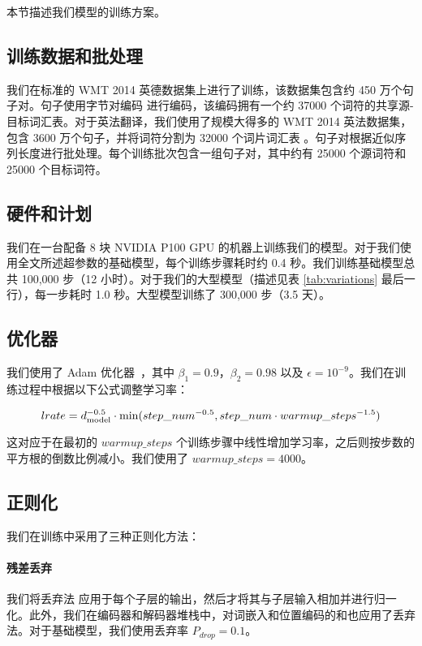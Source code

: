 本节描述我们模型的训练方案。


\subsection{训练数据和批处理}
我们在标准的 WMT 2014 英德数据集上进行了训练，该数据集包含约 450 万个句子对。句子使用字节对编码 \citep{DBLP:journals/corr/BritzGLL17} 进行编码，该编码拥有一个约 37000 个词符的共享源-目标词汇表。对于英法翻译，我们使用了规模大得多的 WMT 2014 英法数据集，包含 3600 万个句子，并将词符分割为 32000 个词片词汇表 \citep{wu2016google}。句子对根据近似序列长度进行批处理。每个训练批次包含一组句子对，其中约有 25000 个源词符和 25000 个目标词符。

\subsection{硬件和计划}

我们在一台配备 8 块 NVIDIA P100 GPU 的机器上训练我们的模型。对于我们使用全文所述超参数的基础模型，每个训练步骤耗时约 0.4 秒。我们训练基础模型总共 100,000 步（12 小时）。对于我们的大型模型（描述见表 \ref{tab:variations} 最后一行），每一步耗时 1.0 秒。大型模型训练了 300,000 步（3.5 天）。

\subsection{优化器}
我们使用了 Adam 优化器~\citep{kingma2014adam}，其中 $\beta_1=0.9$，$\beta_2=0.98$ 以及 $\epsilon=10^{-9}$。我们在训练过程中根据以下公式调整学习率：

\begin{equation}
lrate = d_{\text{model}}^{-0.5} \cdot
  \min({step\_num}^{-0.5},
    {step\_num} \cdot {warmup\_steps}^{-1.5})
\end{equation}

这对应于在最初的 $warmup\_steps$ 个训练步骤中线性增加学习率，之后则按步数的平方根的倒数比例减小。我们使用了 $warmup\_steps=4000$。

\subsection{正则化} \label{sec:reg}

我们在训练中采用了三种正则化方法：
\paragraph{残差丢弃}
我们将丢弃法 \citep{srivastava2014dropout} 应用于每个子层的输出，然后才将其与子层输入相加并进行归一化。此外，我们在编码器和解码器堆栈中，对词嵌入和位置编码的和也应用了丢弃法。对于基础模型，我们使用丢弃率 $P_{drop}=0.1$。

